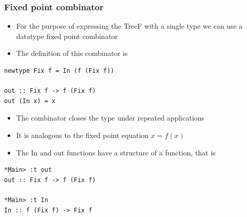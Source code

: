 \documentclass[10pt]{beamer}
\begin{document}
\begin{frame}[fragile]
\frametitle{Fixed point combinator}
\begin{itemize}
\item For the purpose of expressing the TreeF with a single type we can use a datatype fixed point combinator
\item The definition of this combinator is 
\end{itemize}

\begin{lstlisting}
newtype Fix f = In (f (Fix f))

out :: Fix f -> f (Fix f)
out (In x) = x
\end{lstlisting}


\begin{itemize}
\item The combinator closes the type under repeated applications
\item It is analogous to the fixed point equation $x = f (x)$ 	
\item The In and out functions have a structure of a function, that is

\end{itemize}

\begin{lstlisting}
*Main> :t out 
out :: Fix f -> f (Fix f)

*Main> :t In
In :: f (Fix f) -> Fix f
\end{lstlisting}


\end{frame}
\end{document}
